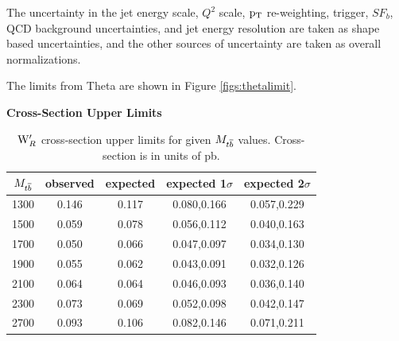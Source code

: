 The uncertainty in the jet energy scale, $Q^2$ scale, $\mathrm{p_{T}}$ re-weighting, trigger, $SF_b$, QCD background uncertainties, and jet energy resolution are taken 
as shape based uncertainties, and the other sources of uncertainty are taken as overall normalizations.  

The limits from Theta are shown in Figure \ref{figs:thetalimit}.

\begin{table}
\begin{center}
\bf{Cross-Section Upper Limits}\\
\begin{tabular}{|c||c|c|c|c|}
\hline
\bf{$M_{{t\overline{b}}}$} & \bf{observed}  & \bf{expected} & \bf{expected 1$\sigma$}  & \bf{expected 2$\sigma$} \\
\hline
\hline
1300 & 0.146 & 0.117 & 0.080,0.166 & 0.057,0.229\\
\hline
1500 & 0.059 & 0.078 & 0.056,0.112 & 0.040,0.163\\
\hline
1700 & 0.050 & 0.066 & 0.047,0.097 & 0.034,0.130\\
\hline
1900 & 0.055 & 0.062 & 0.043,0.091 & 0.032,0.126\\
\hline
2100 & 0.064 & 0.064 & 0.046,0.093 & 0.036,0.140\\
\hline
2300 & 0.073 & 0.069 & 0.052,0.098 & 0.042,0.147\\
\hline
2700 & 0.093 & 0.106 & 0.082,0.146 & 0.071,0.211\\
\hline
\end{tabular}
\end{center}
\caption{$\mathrm{W}^\prime_R$ cross-section upper limits for given $M_{{t\overline{b}}}$ values.  Cross-section is in units of pb.}
\label{table:upperxsec}
\end{table}


